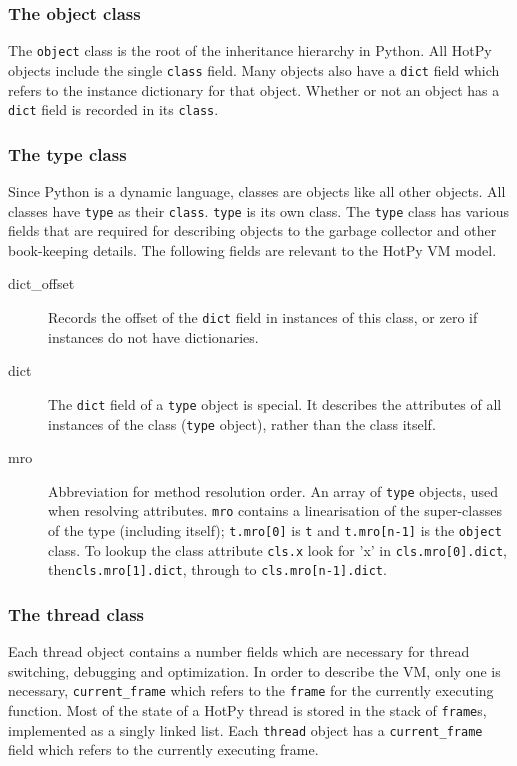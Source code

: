 \subsubsection{The object class}
The \verb|object| class is the root of the inheritance hierarchy in Python. All HotPy objects include the single \verb|class| field. 
Many objects also have a \verb|dict| field which refers to the instance dictionary for that object.
Whether or not an object has a \verb|dict| field is recorded in its \verb|class|.

\subsubsection{The type class}
Since Python is a dynamic language, classes are objects like all other objects. All classes have \verb|type| as their \verb|class|. \verb|type| is its own class. The \verb|type| class has various fields that are required for describing objects to the garbage collector and other book-keeping details. The following fields are relevant to the HotPy VM model.
\begin{description}
\item[dict\_offset] Records the offset of the \verb|dict| field in instances of this class, or zero if instances do not have dictionaries.
\item[dict] The \verb|dict| field of a \verb|type| object is special.
It describes the attributes of all instances of the class (\verb|type| object), rather than the class itself.
\item[mro] Abbreviation for method resolution order. An array of \verb|type| objects, used when resolving attributes. \verb|mro| contains a linearisation of the super-classes of the type (including itself);  \verb|t.mro[0]| is \verb|t| and \verb|t.mro[n-1]| is the \verb|object| class.
To lookup the class attribute \verb|cls.x| look for 'x' in \verb|cls.mro[0].dict|, then\verb|cls.mro[1].dict|, through to \verb|cls.mro[n-1].dict|.
\end{description}

\subsubsection{The thread class}
Each thread object contains a number fields which are necessary for thread switching, debugging and optimization.
In order to describe the VM, only one is necessary, \verb|current_frame| which refers to the \verb|frame| for the currently executing function.
Most of the state of a HotPy thread is stored in the stack of \verb|frame|s, implemented as a singly linked list. Each \verb|thread| object has a \verb|current_frame| field which refers to the currently executing frame.

